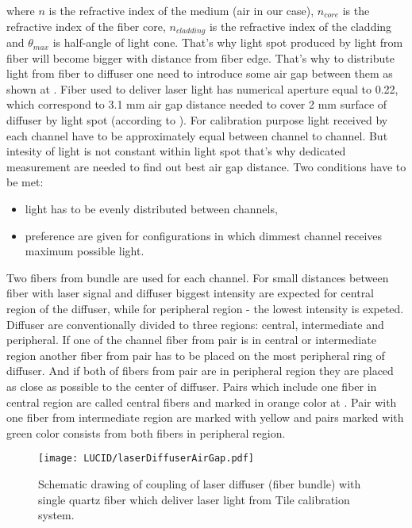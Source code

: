 where $n$ is the refractive index of the medium (air in our case), $n_{core}$ is the refractive index of the fiber core, $n_{cladding}$ is the refractive index of the cladding
and $\theta_{max}$ is half-angle of light cone. That's why light spot produced by light from fiber will become bigger with distance from fiber edge. 
That's why to distribute light from fiber to diffuser one need to introduce some air gap between them as shown at .
Fiber used to deliver laser light has numerical aperture equal to 0.22, which correspond to 3.1 mm air gap distance needed to cover 2 mm surface of diffuser by light spot
(according to ).
For calibration purpose light received by each channel have to be approximately equal between channel to channel. But intesity of light is not constant within light spot
that's why dedicated measurement are needed to find out best air gap distance.
Two conditions have to be met:
\begin{itemize}
 \item light has to be evenly distributed between channels,
 \item preference are given for configurations in which dimmest channel receives maximum possible light.
\end{itemize}
Two fibers from bundle are used for each channel. For small distances between fiber with laser signal and diffuser biggest intensity are expected for central region of the diffuser, 
while for peripheral region - the lowest intensity is expeted. 
Diffuser are conventionally divided to three regions: central, intermediate and peripheral. 
If one of the channel fiber from pair is in central or intermediate region another fiber from pair has to be placed on the most peripheral ring of diffuser.
And if both of fibers from pair are in peripheral region they are placed as close as possible to the center of diffuser.
Pairs which include one fiber in central region are called central fibers and marked in orange color at .
Pair with one fiber from intermediate region are marked with yellow and pairs marked with green color consists from both fibers in peripheral region.

\begin{figure}
\centering
\texttt{[image: LUCID/laserDiffuserAirGap.pdf]}
\caption{Schematic drawing of coupling of laser diffuser (fiber bundle) with single quartz fiber which deliver laser light from Tile calibration system.}
\label{fig:laserDiffuserSchematics}
\end{figure}


